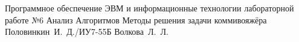 \documentclass{bmstu}
\begin{document}
	
	{Программное обеспечение ЭВМ и информационные технологии}
	{лабораторной работе №6}
	{Анализ Алгоритмов}
	{Методы решения задачи коммивояжёра}
	{}
	{Половинкин~И.~Д./ИУ7-55Б}
	{Волкова~Л.~Л.}
	
	\maketableofcontents
	
	
	
	
	
	
	
	
	\makebibliography

	
	
\end{document}
